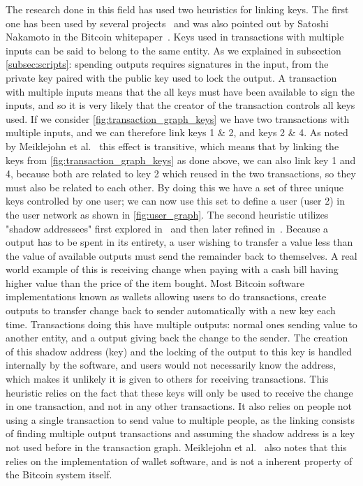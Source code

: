 The research done in this field has used two heuristics for linking keys. The first one has been used by several projects~\cite{reid2013analysis,meiklejohn2013fistful,androulaki2013evaluating,ron2013quantitative} and was also pointed out by Satoshi Nakamoto in the Bitcoin whitepaper~\cite{nakamoto2008bitcoin}. Keys used in transactions with multiple inputs can be said to belong to the same entity. As we explained in subsection \cref{subsec:scripts}: spending outputs requires signatures in the input, from the private key paired with the public key used to lock the output. A transaction with multiple inputs means that the all keys must have been available to sign the inputs, and so it is very likely that the creator of the transaction controls all keys used. If we consider \cref{fig:transaction_graph_keys} we have two transactions with multiple inputs, and we can therefore link keys 1 \& 2, and keys 2 \& 4. As noted by Meiklejohn et al.~\cite{meiklejohn2013fistful} this effect is transitive, which means that by linking the keys from \cref{fig:transaction_graph_keys} as done above, we can also link key 1 and 4, because both are related to key 2 which reused in the two transactions, so they must also be related to each other. By doing this we have a set of three unique keys controlled by one user; we can now use this set to define a user (user 2) in the user network as shown in \cref{fig:user_graph}. The second heuristic utilizes "shadow addressees" first explored in~\cite{androulaki2013evaluating} and then later refined in~\cite{meiklejohn2013fistful}. Because a output has to be spent in its entirety, a user wishing to transfer a value less than the value of available outputs must send the remainder back to themselves. A real world example of this is receiving change when paying with a cash bill having higher value than the price of the item bought. Most Bitcoin software implementations known as wallets allowing users to do transactions, create outputs to transfer change back to sender automatically with a new key each time. Transactions doing this have multiple outputs: normal ones sending value to another entity, and a output giving back the change to the sender. The creation of this shadow address (key) and the locking of the output to this key is handled internally by the software, and users would not necessarily know the address, which makes it unlikely it is given to others for receiving transactions. This heuristic relies on the fact that these keys will only be used to receive the change in one transaction, and not in any other transactions. It also relies on people not using a single transaction to send value to multiple people, as the linking consists of finding multiple output transactions and assuming the shadow address is a key not used before in the transaction graph. Meiklejohn et al.~\cite{meiklejohn2013fistful} also notes that this relies on the implementation of wallet software, and is not a inherent property of the Bitcoin system itself. 
